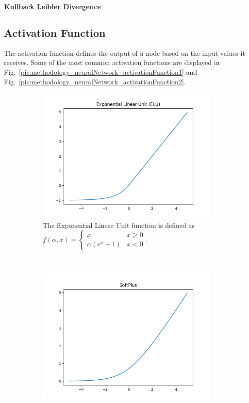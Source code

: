 \noindent
\textbf{Kullback Leibler Divergence}

\subsection{Activation Function}
The activation function defines the output of a node based on the input values it receives. Some of the most common activation functions are displayed in Fig.~\ref{pic:methodology_neuralNetwork_activationFunction1} and Fig.~\ref{pic:methodology_neuralNetwork_activationFunction2}.
\begin{figure}[h!]
	\centering
	\begin{subfigure}[t]{0.45\textwidth}
		\centering
		\includegraphics[width=\textwidth]{img/methodology_neuralNetwork_activationFunction_elu.png}
		\caption{The Exponential Linear Unit function is defined as $f(\alpha, x) = \begin{cases} x & x \geq 0 \\ \alpha (e^x - 1) & x < 0 \end{cases}$.}
	\end{subfigure}%
	~ 
	\begin{subfigure}[t]{0.45\textwidth}
		\centering
		\includegraphics[width=\textwidth]{img/methodology_neuralNetwork_activationFunction_softplus.png}

\end{subfigure}
\end{figure}
